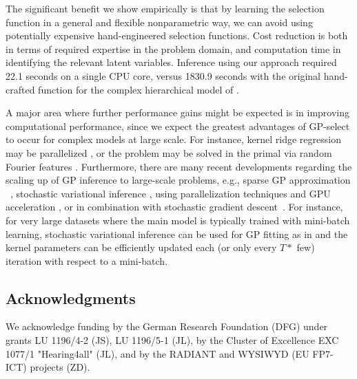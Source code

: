 \documentclass[12pt]{article}
\begin{document}
The significant benefit we show empirically is that by learning the selection function in a general and flexible nonparametric way, we can avoid using potentially expensive hand-engineered selection functions.
Cost reduction is both in terms of required expertise in the problem domain, and computation time in identifying the relevant latent variables.
Inference using our approach required 22.1 seconds on a single CPU core, versus  1830.9 seconds with the original hand-crafted function 
for the complex hierarchical model of \citep{DaiEtAl2013}.

A major area where further performance gains might be expected is in
improving computational performance, since we expect the greatest
advantages of GP-select to occur for complex models at large scale. For instance,
 kernel ridge regression may be parallelized \citep{zhang14divide},
or the problem may be solved in the primal via random Fourier features \citep{LeSarSmo13}.
Furthermore, there are many recent developments regarding the scaling up of GP inference to large-scale problems, e.g., sparse GP approximation
~\citep{sparseGP}, stochastic variational inference \citep{HensmanEtAl2013,Hensman2012}, using parallelization techniques and GPU acceleration \citep{DaiEtAl2014}, or in combination with stochastic gradient descent~\citep{Bottou08thetradeoffs}. 
For instance, for very large datasets where the main model is typically trained with mini-batch learning, stochastic variational inference can be used for GP fitting as in \citep{HensmanEtAl2013} and the kernel parameters can be efficiently updated each (or only every $T*$ few) iteration with respect to a mini-batch.


\subsection*{Acknowledgments}
We acknowledge funding by the German Research Foundation (DFG) under grants LU 1196/4-2 (JS), LU 1196/5-1 (JL), by the Cluster of Excellence EXC 1077/1 "Hearing4all" (JL), and by the RADIANT and WYSIWYD (EU FP7-ICT) projects (ZD).
\end{document}
